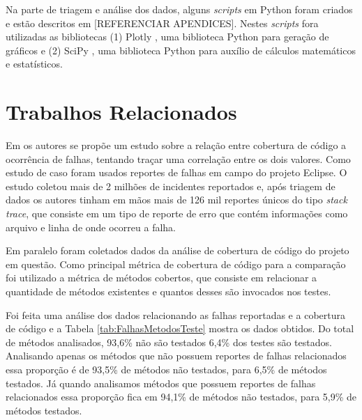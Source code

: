 \documentclass[11.5pt]{article}
\begin{document}
Na parte de triagem e análise dos dados, alguns \textit{scripts} em Python foram criados e estão
descritos em [REFERENCIAR APENDICES]. Nestes \textit{scripts} fora utilizadas as bibliotecas
(1) Plotly \cite{plotly}, uma biblioteca Python para geração de gráficos e (2) SciPy \cite{scipy},
uma biblioteca Python para auxílio de cálculos matemáticos e estatísticos.



\section{Trabalhos Relacionados}

Em \cite{unitTestedCrash} os autores se propõe um estudo sobre a relação entre cobertura de código
a ocorrência de falhas, tentando traçar uma correlação entre os dois valores.
Como estudo de caso foram usados reportes de falhas em campo do projeto Eclipse.
O estudo coletou mais de 2 milhões de incidentes reportados e, após triagem de dados os autores
tinham em mãos mais de 126 mil reportes únicos do tipo \textit{stack trace}, que consiste em um tipo
de reporte de erro que contém informações como arquivo e linha de onde ocorreu a falha.

Em paralelo foram coletados dados da análise de cobertura de código do projeto em questão.
Como principal métrica de cobertura de código para a comparação foi utilizado a métrica de métodos
cobertos, que consiste em relacionar a quantidade de métodos existentes e quantos desses são
invocados nos testes.

Foi feita uma análise dos dados relacionando as falhas reportadas e a cobertura de código e a Tabela
\ref{tab:FalhasMetodosTeste} mostra os dados obtidos.
Do total de métodos analisados, 93,6\% não são testados 6,4\% dos testes são testados.
Analisando apenas os métodos que não possuem reportes de falhas relacionados essa proporção é de
93,5\% de métodos não testados, para 6,5\% de métodos testados.
Já quando analisamos métodos que possuem reportes de falhas relacionados essa proporção fica em
94,1\% de métodos não testados, para 5,9\% de métodos testados.
\end{document}
